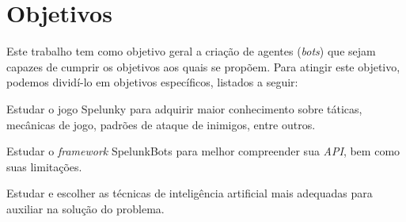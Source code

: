 \chapter{\label{chap:objectives}Objetivos}
Este trabalho tem como objetivo geral a criação de agentes (\textit{bots})
que sejam capazes de cumprir os objetivos aos quais se propõem. Para atingir este objetivo, podemos dividí-lo em objetivos específicos, listados a seguir:

\begin{description}
    \item Estudar o jogo Spelunky para adquirir maior conhecimento sobre táticas, mecânicas de jogo, padrões de ataque de inimigos, entre outros.

    \item Estudar o \textit{framework} SpelunkBots para melhor compreender sua \textit{API}, bem como suas limitações.

    \item Estudar e escolher as técnicas de inteligência artificial mais adequadas para auxiliar na solução do problema.
\end{description}